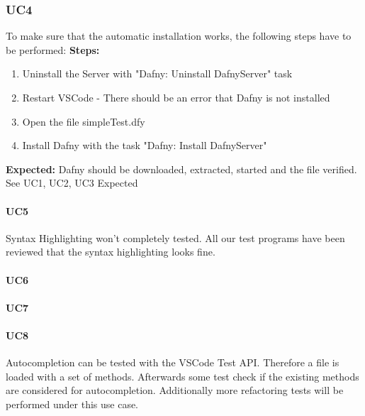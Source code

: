 \subsubsection{UC4}
To make sure that the automatic installation works, the following steps have to be performed: 
\textbf{\newline Steps:}
\begin{enumerate}
\item Uninstall the Server with "Dafny: Uninstall DafnyServer" task
\item Restart VSCode - There should be an error that Dafny is not installed
\item Open the file simpleTest.dfy
\item Install Dafny with the task "Dafny: Install DafnyServer" 
\end{enumerate}
\textbf{\newline Expected:}
Dafny should be downloaded, extracted, started and the file verified. See UC1, UC2, UC3 Expected


\paragraph{UC5}
Syntax Highlighting won't completely tested. All our test programs have been reviewed that the syntax highlighting looks fine.  

\paragraph{UC6}


\paragraph{UC7}

\paragraph{UC8}
Autocompletion can be tested with the VSCode Test API. Therefore a file is loaded with a set of methods. Afterwards some test check if the existing methods are considered for autocompletion. Additionally more refactoring tests will be performed under this use case. 